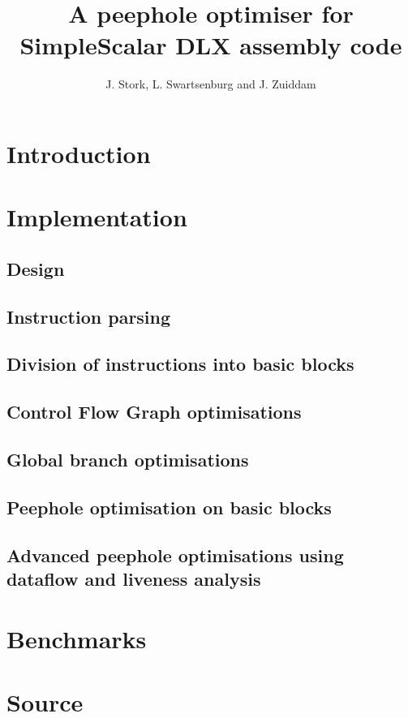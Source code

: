 \documentclass{scrreprt}
\title{A peephole optimiser for SimpleScalar DLX assembly code}
\author{J. Stork, L. Swartsenburg and J. Zuiddam}
\begin{document}
\maketitle


\chapter{Introduction}
\label{sec:introduction}



\chapter{Implementation}

\section{Design}
\label{sec:design}


\section{Instruction parsing}
\label{sec:parsing}


\section{Division of instructions into basic blocks}
\label{sec:splitting}


\section{Control Flow Graph optimisations}
\label{sec:graph}


\section{Global branch optimisations}
\label{sec:global}


\section{Peephole optimisation on basic blocks}
\label{sec:peephole}


\section{Advanced peephole optimisations using dataflow and liveness analysis}
\label{sec:advanced}



\chapter{Benchmarks}
\label{sec:benchmarks}



\appendix
\chapter{Source}
\label{ch:source}

\end{document}
